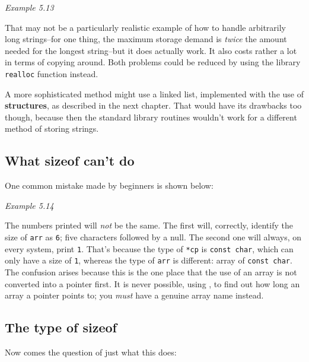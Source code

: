    \begin{center}\textit{Example 5.13}\end{center}


  That may not be a particularly realistic example of how to handle
   arbitrarily long strings--for one thing, the maximum storage demand
   is \textit{twice} the amount needed for the longest string--but it
   does actually work. It also costs rather a lot in terms of copying
   around. Both problems could be reduced by using the library
   \texttt{realloc} function instead.


  A more sophisticated method might use a linked list, implemented with
   the use of \textbf{structures}, as described in the next chapter. That
   would have its drawbacks too though, because then the standard library
   routines wouldn't work for a different method of storing strings.


  \subsection{What sizeof can't do}
   

   One common mistake made by beginners is shown below:


   \begin{center}\textit{Example 5.14}\end{center}


   The numbers printed will \textit{not} be the same. The first will,
    correctly, identify the size of \texttt{arr} as \texttt{6}; five
    characters followed by a null. The second one will always, on every
    system, print \texttt{1}. That's because the type of
    \texttt{*cp} is \texttt{const char}, which can only have a size
    of \texttt{1}, whereas the type of \texttt{arr} is different:
    array of \texttt{const char}. The confusion arises because this is
    the one place that the use of an array is not converted into a pointer
    first. It is never possible, using \sizeof, to find out how
    long an array a pointer points to; you \textit{must} have a genuine
    array name instead.


  

  \subsection{The type of sizeof}
   

   Now comes the question of just what this does:


